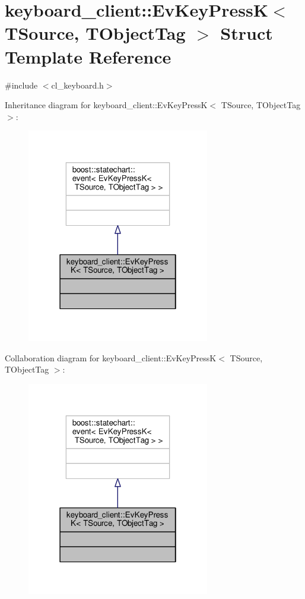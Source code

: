\hypertarget{structkeyboard__client_1_1EvKeyPressK}{}\section{keyboard\+\_\+client\+:\+:Ev\+Key\+PressK$<$ T\+Source, T\+Object\+Tag $>$ Struct Template Reference}
\label{structkeyboard__client_1_1EvKeyPressK}


{\ttfamily \#include $<$cl\+\_\+keyboard.\+h$>$}



Inheritance diagram for keyboard\+\_\+client\+:\+:Ev\+Key\+PressK$<$ T\+Source, T\+Object\+Tag $>$\+:\nopagebreak
\begin{figure}[H]
\begin{center}
\leavevmode
\includegraphics[width=226pt]{structkeyboard__client_1_1EvKeyPressK__inherit__graph}
\end{center}
\end{figure}


Collaboration diagram for keyboard\+\_\+client\+:\+:Ev\+Key\+PressK$<$ T\+Source, T\+Object\+Tag $>$\+:\nopagebreak
\begin{figure}[H]
\begin{center}
\leavevmode
\includegraphics[width=226pt]{structkeyboard__client_1_1EvKeyPressK__coll__graph}
\end{center}
\end{figure}


